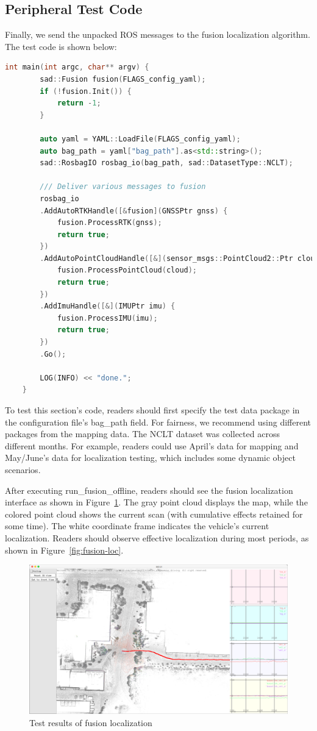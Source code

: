 \subsection{Peripheral Test Code}
Finally, we send the unpacked ROS messages to the fusion localization algorithm. The test code is shown below:

\begin{lstlisting}[language=c++,caption=src/ch10/run\_fusion\_offline.cc]
	int main(int argc, char** argv) {	
		sad::Fusion fusion(FLAGS_config_yaml);
		if (!fusion.Init()) {
			return -1;
		}
		
		auto yaml = YAML::LoadFile(FLAGS_config_yaml);
		auto bag_path = yaml["bag_path"].as<std::string>();
		sad::RosbagIO rosbag_io(bag_path, sad::DatasetType::NCLT);
		
		/// Deliver various messages to fusion
		rosbag_io
		.AddAutoRTKHandle([&fusion](GNSSPtr gnss) {
			fusion.ProcessRTK(gnss);
			return true;
		})
		.AddAutoPointCloudHandle([&](sensor_msgs::PointCloud2::Ptr cloud) -> bool {
			fusion.ProcessPointCloud(cloud);
			return true;
		})
		.AddImuHandle([&](IMUPtr imu) {
			fusion.ProcessIMU(imu);
			return true;
		})
		.Go();
		
		LOG(INFO) << "done.";
	}
\end{lstlisting}

To test this section's code, readers should first specify the test data package in the configuration file's bag\_path field. For fairness, we recommend using different packages from the mapping data. The NCLT dataset was collected across different months. For example, readers could use April's data for mapping and May/June's data for localization testing, which includes some dynamic object scenarios.

After executing run\_fusion\_offline, readers should see the fusion localization interface as shown in Figure~\ref{fig:fusion-test}. The gray point cloud displays the map, while the colored point cloud shows the current scan (with cumulative effects retained for some time). The white coordinate frame indicates the vehicle's current localization. Readers should observe effective localization during most periods, as shown in Figure~\ref{fig:fusion-loc}.

\begin{figure}[!t]
	\centering
	\includegraphics[width=1.0\textwidth]{resources/localization/fusion_offline.png}
	\caption{Test results of fusion localization}
	\label{fig:fusion-test}
\end{figure}

